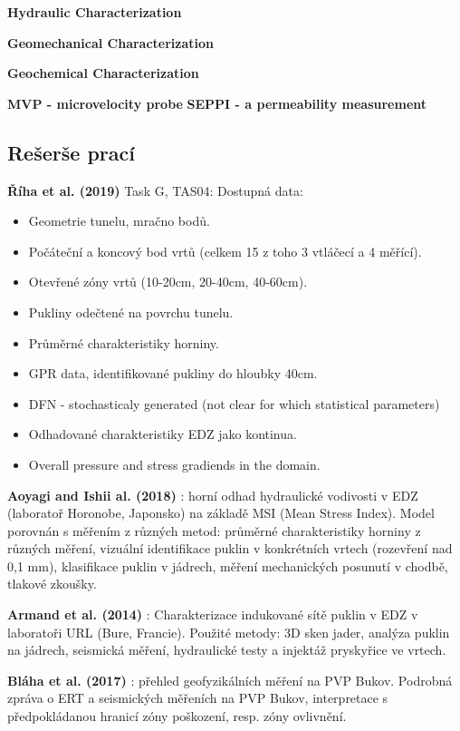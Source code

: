 \documentclass{article}
\begin{document}
{\bf  Hydraulic Characterization} \cite{Lanyon2011}

{\bf  Geomechanical Characterization} \cite{Lanyon2011}

{\bf  Geochemical Characterization} \cite{Lanyon2011}

{\bf MVP - microvelocity probe} \cite{Rutqvist2009} 
{\bf SEPPI - a permeability measurement} \cite{Rutqvist2009} 


\subsection{Rešerše prací}

{\bf Říha et al. (2019)} Task G, TAS04: Dostupná data: 
\begin{itemize}
    \item Geometrie tunelu, mračno bodů.
    \item Počáteční a koncový bod vrtů (celkem 15 z toho 3 vtláčecí a 4 měřící).
    \item Otevřené zóny vrtů (10-20cm, 20-40cm, 40-60cm).
    \item Pukliny odečtené na povrchu tunelu.
    \item Průměrné charakteristiky horniny.
    \item GPR data, identifikované pukliny do hloubky 40cm.
    \item DFN - stochasticaly generated (not clear for which statistical parameters)
    \item Odhadované charakteristiky EDZ jako kontinua.
    \item Overall pressure and stress gradiends in the domain.
\end{itemize}

{\bf Aoyagi and Ishii al. (2018)} \cite{Aoyagi2018}: horní odhad hydraulické vodivosti v EDZ (laboratoř Horonobe, Japonsko) na základě MSI (Mean Stress Index). Model porovnán s měřením z různých metod: průměrné charakteristiky horniny z různých měření, vizuální identifikace puklin v konkrétních vrtech (rozevření nad 0,1 mm), klasifikace puklin v jádrech, měření mechanických posunutí v chodbě, tlakové zkoušky.

{\bf Armand et al. (2014)} \cite{Armand2014}: Charakterizace indukované sítě puklin v EDZ v laboratoři URL (Bure, Francie). Použité metody: 3D sken jader, analýza puklin na jádrech, seismická měření, hydraulické testy a injektáž pryskyřice ve vrtech. 

{\bf Bláha et al. (2017)} \cite{SURAO_184/2014}: přehled geofyzikálních měření na PVP Bukov.
Podrobná zpráva o ERT a seismických měřeních na PVP Bukov, interpretace s předpokládanou hranicí zóny poškození, resp. zóny ovlivnění.  
\end{document}
